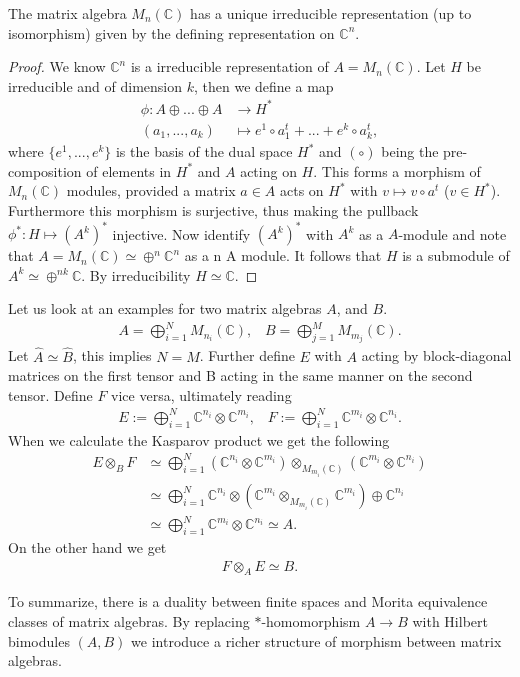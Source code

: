 \begin{lemma}
    The matrix algebra $M_n(\mathbb{C})$ has a unique irreducible
    representation (up to isomorphism) given by the defining representation on
    $\mathbb{C}^n$.
\end{lemma}
\begin{proof}
    We know $\mathbb{C}^n$ is a irreducible representation of $A=
    M_n(\mathbb{C})$. Let $H$ be irreducible and of dimension $k$, then we
    define a map
    \begin{align}
        \phi : A\oplus...\oplus A &\rightarrow H^* \\
    (a_1,...,a_k)&\mapsto e^1\circ a_1^t+...+e^k\circ a_k^t,
    \end{align}
where $\{e^1,...,e^k\}$ is the basis of the dual space $H^*$ and
$(\circ)$ being the pre-composition of elements in $H^*$ and $A$ acting on $H$.
This forms a morphism of $M_n(\mathbb{C})$ modules, provided a matrix $a \in A$
acts on $H^*$ with $v\mapsto v\circ a^t$ ($v\in H^*$).  Furthermore this
morphism is surjective, thus making the pullback $\phi ^*:H\mapsto (A^k)^*$
injective.  Now identify $(A^k)^*$ with $A^k$ as a $A$-module and note that
$A=M_n(\mathbb{C}) \simeq \oplus ^n \mathbb{C}^n$ as a n A module.  It follows
that $H$ is a submodule of $A^k \simeq \oplus ^{nk}\mathbb{C}$. By
irreducibility $H \simeq \mathbb{C}$.
\end{proof}

Let us look at an examples for two matrix algebras $A$, and $B$.
\begin{align}
    A = \bigoplus ^N_{i=1} M_{n_i}(\mathbb{C}), \;\;\;
    B = \bigoplus ^M_{j=1} M_{m_j}(\mathbb{C}).
\end{align}
Let $\hat{A} \simeq \hat{B}$, this implies $N=M$. Further define $E$ with $A$
acting by block-diagonal matrices on the first tensor and B acting in the same
manner on the second tensor. Define $F$ vice versa, ultimately reading
\begin{align}
    E:= \bigoplus _{i=1}^N \mathbb{C}^{n_i} \otimes \mathbb{C}^{m_i}, \;\;\;
    F:= \bigoplus _{i=1}^N \mathbb{C}^{m_i} \otimes \mathbb{C}^{n_i}.
\end{align}
When we calculate the Kasparov product we get the following
\begin{align}
    E \otimes _B F &\simeq \bigoplus _{i=1}^N (\mathbb{C}^{n_i}\otimes\mathbb{C}^{m_i})
        \otimes _{M_{m_i}(\mathbb{C})} (\mathbb{C}^{m_i}\otimes\mathbb{C}^{n_i}) \\
                   &\simeq \bigoplus _{i=1}^N \mathbb{C}^{n_i}\otimes
                   \left(\mathbb{C}^{m_i}\otimes _{M_{m_i}(\mathbb{C})}\mathbb{C}^{m_i}\right)
                    \oplus \mathbb{C}^{n_i} \\
                   &\simeq \bigoplus _{i=1}^N
                   \mathbb{C}^{m_i}\otimes\mathbb{C}^{n_i} \simeq A.
\end{align}
On the other hand we get
\begin{align}
    F \otimes _A E \simeq B.
\end{align}

To summarize, there is a duality between finite spaces and Morita equivalence classes of matrix algebras. By replacing $*$-homomorphism $A\rightarrow B$ with Hilbert bimodules $(A,B)$ we introduce
a richer structure of morphism between matrix algebras.
